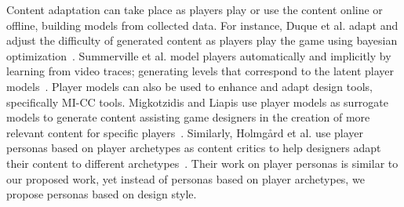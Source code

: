 Content adaptation can take place as players play or use the content online or offline, building models from collected data. For instance, Duque et al. adapt and adjust the difficulty of generated content as players play the game using bayesian optimization~. Summerville et al. model players automatically and implicitly by learning from video traces; generating levels that correspond to the latent player models~. Player models can also be used to enhance and adapt design tools, specifically MI-CC tools. Migkotzidis and Liapis use player models as surrogate models to generate content assisting game designers in the creation of more relevant content for specific players~. Similarly, Holmgård et al. use player personas based on player archetypes as content critics to help designers adapt their content to different archetypes~. Their work on player personas is similar to our proposed work, yet instead of personas based on player archetypes, we propose personas based on design style.



















